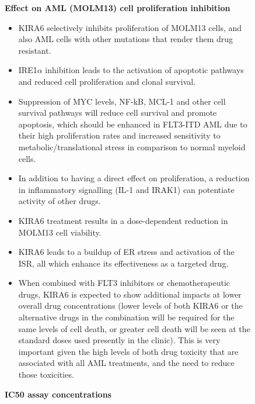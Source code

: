 \begin{figure}[htbp!]
\begin{tcolorbox}[
    colback=black!5!white,
    colframe=black!60!white,
    title=\textbf{KIRA6 for AML (continued)},
    fonttitle=\bfseries,
    arc=3mm,
    boxrule=1pt,
    bottomrule=2pt,
]
\scriptsize
\textbf{Effect on AML (MOLM13) cell proliferation inhibition}
\begin{itemize}
    \item KIRA6 selectively inhibits proliferation of MOLM13 cells, and also AML cells with other mutations that render them drug resistant.
    \item IRE1$\alpha$ inhibition leads to the activation of apoptotic pathways and reduced cell proliferation and clonal survival.
    \item Suppression of MYC levels, NF-kB, MCL-1 and other cell survival pathways will reduce cell survival and promote apoptosis, which should be enhanced in FLT3-ITD AML due to their high proliferation rates and increased sensitivity to metabolic/translational stress in comparison to normal myeloid cells.
    \item In addition to having a direct effect on proliferation, a reduction in inflammatory signalling (IL-1 and IRAK1) can potentiate activity of other drugs.
    \item KIRA6 treatment results in a dose-dependent reduction in MOLM13 cell viability.
    \item KIRA6 leads to a buildup of ER stress and activation of the ISR, all which enhance its effectiveness as a targeted drug.
    \item When combined with FLT3 inhibitors or chemotherapeutic drugs, KIRA6 is expected to show additional impacts at lower overall drug concentrations (lower levels of both KIRA6 or the alternative drugs in the combination will be required for the same levels of cell death, or greater cell death will be seen at the standard doses used presently in the clinic). This is very important given the high levels of both drug toxicity that are associated with all AML treatments, and the need to reduce those toxicities.
\end{itemize}

\textbf{IC50 assay concentrations}


\end{tcolorbox}
\end{figure}
